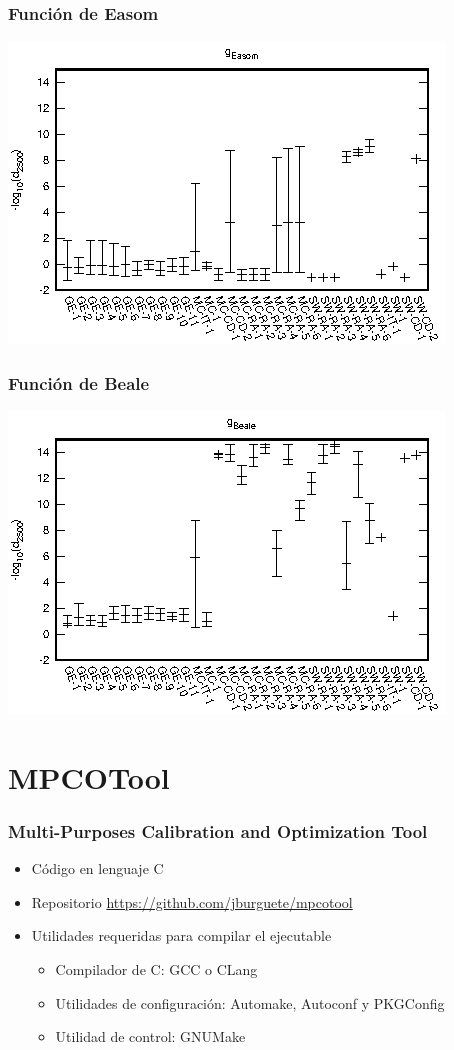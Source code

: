 \documentclass{beamer}
\begin{document}
\begin{frame}
	\frametitle{Función de Easom}
	\includegraphics[width=\textwidth]{Easom-e.eps}
\end{frame}

\begin{frame}
	\frametitle{Función de Beale}
	\includegraphics[width=\textwidth]{Beale-e.eps}
\end{frame}

\section{MPCOTool}

\begin{frame}
	\frametitle{Multi-Purposes Calibration and Optimization Tool}
	\begin{itemize}
		\item Código en lenguaje C
		\item Repositorio \url{https://github.com/jburguete/mpcotool}
		\item Utilidades requeridas para compilar el ejecutable
			\begin{itemize}
				\item Compilador de C: GCC o CLang
				\item Utilidades de configuración: Automake, Autoconf y
					PKGConfig
				\item Utilidad de control: GNUMake
			\end{itemize}
	\end{itemize}
\end{frame}
\end{document}
